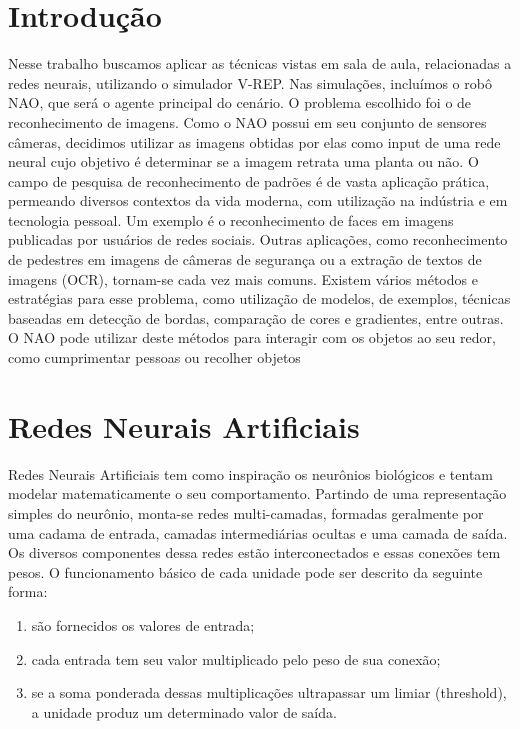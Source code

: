 \documentclass[twoside,conference,a4paper]{IEEEtran}
\begin{document}
\section{Introdução}
Nesse trabalho buscamos aplicar as técnicas vistas em sala de aula, relacionadas a redes neurais, utilizando o simulador V-REP. Nas simulações, incluímos o robô NAO, que será o agente principal do cenário. O problema escolhido foi o de reconhecimento de imagens. Como o NAO possui em seu conjunto de sensores câmeras, decidimos utilizar as imagens obtidas por elas como input de uma rede neural cujo objetivo é determinar se a imagem retrata uma planta ou não. 
O campo de pesquisa de reconhecimento de padrões é de vasta aplicação prática, permeando diversos contextos da vida moderna, com utilização na indústria e em tecnologia pessoal. Um exemplo é o reconhecimento de faces em imagens publicadas por usuários de redes sociais. Outras aplicações, como reconhecimento de pedestres em imagens de câmeras de segurança ou a extração de textos de imagens (OCR), tornam-se cada vez mais comuns. Existem vários métodos e estratégias para esse problema, como utilização de modelos, de exemplos, técnicas baseadas em detecção de bordas, comparação de cores e gradientes, entre outras.
O NAO pode utilizar deste métodos para interagir com os objetos ao seu redor, como cumprimentar pessoas ou recolher objetos

\section{Redes Neurais Artificiais}
Redes Neurais Artificiais tem como inspiração os neurônios biológicos e tentam modelar matematicamente o seu comportamento.
Partindo de uma representação simples do neurônio, monta-se redes multi-camadas, formadas geralmente por uma cadama de entrada, camadas intermediárias ocultas e uma camada de saída. Os diversos componentes dessa redes estão interconectados e essas conexões tem pesos. O funcionamento básico de cada unidade pode ser descrito da seguinte forma:
\begin{enumerate}
 \item são fornecidos os valores de entrada;
 \item cada entrada tem seu valor multiplicado pelo peso de sua conexão;
 \item se a soma ponderada dessas multiplicações ultrapassar um limiar (threshold), a unidade produz um determinado valor de saída.
\end{enumerate}
\end{document}
